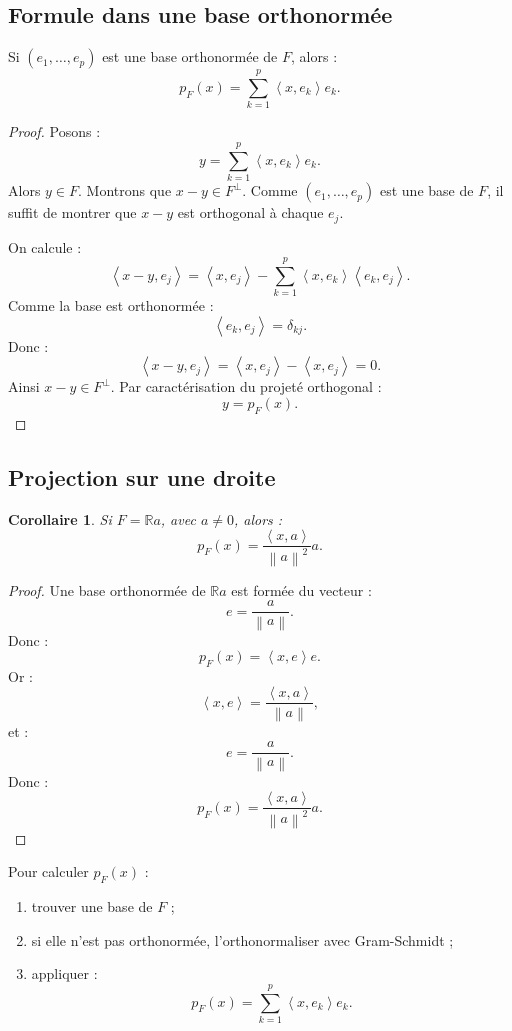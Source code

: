\documentclass[11pt,a4paper]{article}
\newcommand{\R}{\mathbb R}
\newcommand{\norme}[1]{\left\lVert #1\right\rVert}
\newcommand{\scal}[2]{\left\langle #1,#2\right\rangle}
\newtheorem{corollaire}[prop]{Corollaire}
\begin{document}
\subsection{Formule dans une base orthonormée}

\begin{theorembox}
Si \((e_1,\dots,e_p)\) est une base orthonormée de \(F\), alors :
\[
p_F(x)=\sum_{k=1}^p \scal{x}{e_k}e_k.
\]
\end{theorembox}

\begin{proof}
Posons :
\[
y=\sum_{k=1}^p \scal{x}{e_k}e_k.
\]
Alors \(y\in F\).  
Montrons que \(x-y\in F^\perp\).  
Comme \((e_1,\dots,e_p)\) est une base de \(F\), il suffit de montrer que \(x-y\) est orthogonal à chaque \(e_j\).

On calcule :
\[
\scal{x-y}{e_j}
=
\scal{x}{e_j}
-
\sum_{k=1}^p\scal{x}{e_k}\scal{e_k}{e_j}.
\]
Comme la base est orthonormée :
\[
\scal{e_k}{e_j}=\delta_{kj}.
\]
Donc :
\[
\scal{x-y}{e_j}
=
\scal{x}{e_j}-\scal{x}{e_j}=0.
\]
Ainsi \(x-y\in F^\perp\).  
Par caractérisation du projeté orthogonal :
\[
y=p_F(x).
\]
\end{proof}

\subsection{Projection sur une droite}

\begin{corollaire}
Si \(F=\R a\), avec \(a\neq0\), alors :
\[
p_F(x)=\frac{\scal{x}{a}}{\norme{a}^2}a.
\]
\end{corollaire}

\begin{proof}
Une base orthonormée de \(\R a\) est formée du vecteur :
\[
e=\frac{a}{\norme{a}}.
\]
Donc :
\[
p_F(x)=\scal{x}{e}e.
\]
Or :
\[
\scal{x}{e}=\frac{\scal{x}{a}}{\norme{a}},
\]
et :
\[
e=\frac{a}{\norme{a}}.
\]
Donc :
\[
p_F(x)=\frac{\scal{x}{a}}{\norme{a}^2}a.
\]
\end{proof}

\begin{methodbox}
Pour calculer \(p_F(x)\) :
\begin{enumerate}
    \item trouver une base de \(F\) ;
    \item si elle n'est pas orthonormée, l'orthonormaliser avec Gram-Schmidt ;
    \item appliquer :
    \[
    p_F(x)=\sum_{k=1}^p\scal{x}{e_k}e_k.
    \]
\end{enumerate}
\end{methodbox}
\end{document}
